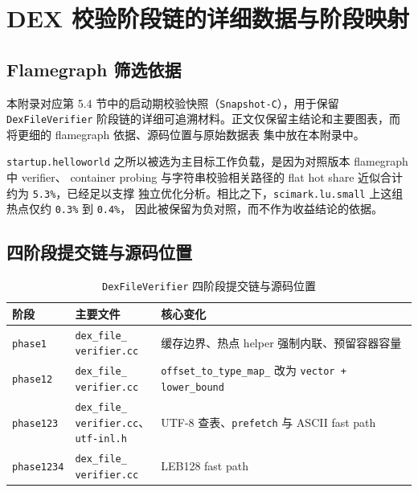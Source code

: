 \section{DEX 校验阶段链的详细数据与阶段映射}\label{app:dexverifier-details}

\subsection{Flamegraph 筛选依据}

本附录对应第 5.4 节中的启动期校验快照（\texttt{Snapshot-C}），用于保留 \texttt{DexFileVerifier}
阶段链的详细可追溯材料。正文仅保留主结论和主要图表，而将更细的 flamegraph 依据、源码位置与原始数据表
集中放在本附录中。

\texttt{startup.helloworld} 之所以被选为主目标工作负载，是因为对照版本 flamegraph 中 verifier、
container probing 与字符串校验相关路径的 flat hot share 近似合计约为 \texttt{5.3\%}，已经足以支撑
独立优化分析。相比之下，\texttt{scimark.lu.small} 上这组热点仅约 \texttt{0.3\%} 到 \texttt{0.4\%}，
因此被保留为负对照，而不作为收益结论的依据。

\subsection{四阶段提交链与源码位置}

\begin{table}[htbp]
    \centering
    \small
    \caption{\texttt{DexFileVerifier} 四阶段提交链与源码位置}
    \label{tab:app-dexverifier-chain}
    \begin{tabular}{>{\raggedright\arraybackslash}p{2.0cm}>{\raggedright\arraybackslash}p{2.4cm}>{\raggedright\arraybackslash}p{5.7cm}}
        \hline
        \textbf{阶段} & \textbf{主要文件} & \textbf{核心变化} \\
        \hline
        \texttt{phase1} & \shortstack[l]{\texttt{dex\_file\_}\\\texttt{verifier.cc}} & 缓存边界、热点 helper 强制内联、预留容器容量 \\
        \texttt{phase12} & \shortstack[l]{\texttt{dex\_file\_}\\\texttt{verifier.cc}} & \texttt{offset\_to\_type\_map\_} 改为 \texttt{vector + lower\_bound} \\
        \texttt{phase123} & \shortstack[l]{\texttt{dex\_file\_}\\\texttt{verifier.cc}、\\\texttt{utf-inl.h}} & UTF-8 查表、\texttt{prefetch} 与 ASCII fast path \\
        \texttt{phase1234} & \shortstack[l]{\texttt{dex\_file\_}\\\texttt{verifier.cc}} & LEB128 fast path \\
        \hline
    \end{tabular}
\end{table}


